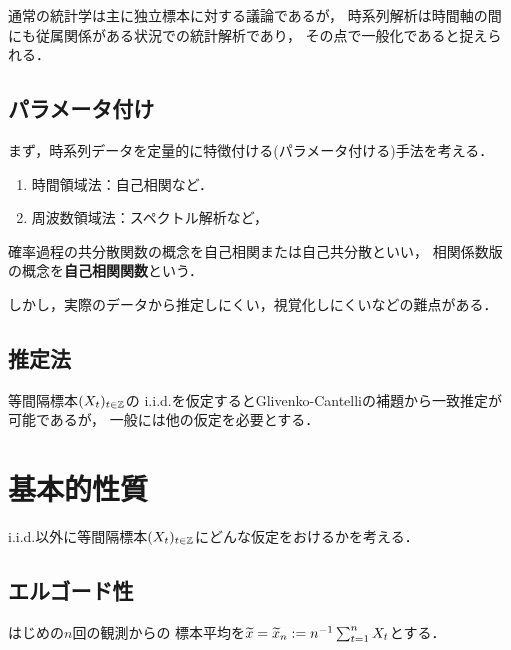 \documentclass[uplatex,dvipdfmx]{jsreport}
\begin{document}
通常の統計学は主に独立標本に対する議論であるが，
時系列解析は時間軸の間にも従属関係がある状況での統計解析であり，
その点で一般化であると捉えられる．

\subsection{パラメータ付け}

まず，時系列データを定量的に特徴付ける(パラメータ付ける)手法を考える．
\begin{enumerate}
    \item 時間領域法：自己相関など．
    \item 周波数領域法：スペクトル解析など，
\end{enumerate}

\begin{definition}
    確率過程の共分散関数の概念を自己相関または自己共分散といい，
    相関係数版の概念を\textbf{自己相関関数}という．
\end{definition}
\begin{remark}
    しかし，実際のデータから推定しにくい，視覚化しにくいなどの難点がある．
\end{remark}

\subsection{推定法}

等間隔標本$(X_t)_{t\in\mathbb{Z}}$の
i.i.d.を仮定するとGlivenko-Cantelliの補題から一致推定が可能であるが，
一般には他の仮定を必要とする．

\section{基本的性質}

\begin{tcolorbox}[colframe=ForestGreen, colback=ForestGreen!10!white,breakable,colbacktitle=ForestGreen!40!white,coltitle=black,fonttitle=\bfseries\sffamily,
title=]
    i.i.d.以外に等間隔標本$(X_t)_{t\in\mathbb{Z}}$にどんな仮定をおけるかを考える．
\end{tcolorbox}

\subsection{エルゴード性}

\begin{notation}
    はじめの$n$回の観測からの
    標本平均を$\widetilde{x}=\widetilde{x}_n:=n^{-1}\sum^n_{t=1}X_t$とする．
\end{notation}
\end{document}
